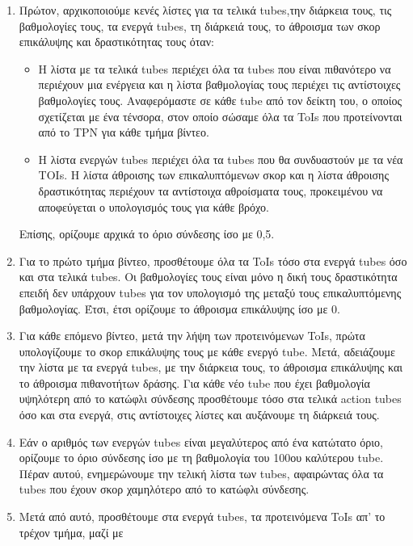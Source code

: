 \begin{enumerate}
\item Πρώτον, αρχικοποιούμε  κενές λίστες για τα τελικά \en tubes\gr,την διάρκεια τους, τις βαθμολογίες τους, τα ενεργά \en tubes\gr,
  τη διάρκειά τους, το άθροισμα των σκορ επικάλυψης  και δραστικότητας τους όταν:
  \begin{itemize}
  \item Η λίστα με τα τελικά \en tubes \gr περιέχει όλα τα \en tubes  \gr που είναι πιθανότερο να περιέχουν μια ενέργεια και η λίστα
    βαθμολογίας τους περιέχει τις αντίστοιχες βαθμολογίες τους. Αναφερόμαστε σε κάθε \en tube \gr από τον δείκτη του, ο οποίος
    σχετίζεται με ένα τένσορα, στον οποίο σώσαμε όλα τα \en ToIs \gr που προτείνονται από το \en TPN \gr για κάθε τμήμα βίντεο.
  \item Η λίστα ενεργών \en tubes \gr περιέχει όλα τα \en tubes \gr που θα συνδυαστούν με τα νέα \en  TOIs\gr.
    Η  λίστα άθροισης των επικαλυπτόμενων σκορ  και η λίστα άθροισης δραστικότητας περιέχουν τα αντίστοιχα αθροίσματα τους,
    προκειμένου να αποφεύγεται ο υπολογισμός τους για κάθε βρόχο. 
  \end{itemize}
Επίσης, ορίζουμε αρχικά  το όριο σύνδεσης ίσο με 0,5.
\item Για το πρώτο τμήμα βίντεο, προσθέτουμε όλα τα \en ToIs \gr τόσο στα ενεργά \en tubes \gr όσο και στα τελικά \en tubes\gr.
  Οι βαθμολογίες τους είναι μόνο η δική τους δραστικότητα επειδή δεν υπάρχουν \en tubes \gr για τον υπολογισμό της μεταξύ τους
  επικαλυπτόμενης βαθμολογίας. Έτσι, έτσι ορίζουμε το άθροισμα επικάλυψης ίσο με 0.
\item Για κάθε επόμενο βίντεο, μετά την λήψη των προτεινόμενων \en ToIs\gr, πρώτα υπολογίζουμε το σκορ επικάλυψης τους με κάθε
  ενεργό \en tube\gr. Μετά, αδειάζουμε την λίστα με τα ενεργά \en tubes\gr, με την διάρκεια τους, το άθροισμα επικάλυψης και το
  άθροισμα πιθανοτήτων δράσης. Για κάθε νέο \en tube \gr που έχει βαθμολογία υψηλότερη από το κατώφλι σύνδεσης
  προσθέτουμε τόσο στα τελικά \en action tubes \gr όσο και στα ενεργά, στις αντίστοιχες λίστες και αυξάνουμε τη διάρκειά τους.
\item Εάν ο αριθμός των ενεργών \en tubes \gr είναι μεγαλύτερος από ένα κατώτατο όριο, ορίζουμε το  όριο σύνδεσης ίσο με τη βαθμολογία του
  100ου καλύτερου \en tube\gr. Πέραν αυτού, ενημερώνουμε την τελική λίστα των \en tubes\gr, αφαιρώντας όλα τα \en tubes \gr
  που έχουν σκορ χαμηλότερο από το κατώφλι σύνδεσης.
\item Μετά από αυτό, προσθέτουμε στα ενεργά \en tubes\gr, τα προτεινόμενα \en ToIs \gr απ' το τρέχον τμήμα, μαζί με

\end{enumerate}
